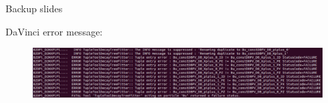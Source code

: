 \documentclass{beamer}
\begin{document}


\begin{frame}{Backup slides}
  \begin{center}
    DaVinci error message:
  \end{center}
  \begin{figure}
    \includegraphics[width = 1\textwidth]{DaVinciError.png}
  \end{figure}
\end{frame}
\end{document}
